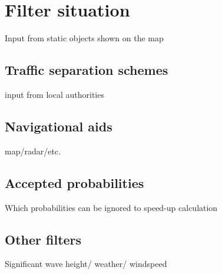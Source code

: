 \chapter{Filter situation}
Input from static objects shown on the map

\section{Traffic separation schemes}
input from local authorities

\section{Navigational aids}
map/radar/etc.

\section{Accepted probabilities}
Which probabilities can be ignored to speed-up calculation

\section{Other filters}
Significant wave height/ weather/ windspeed

